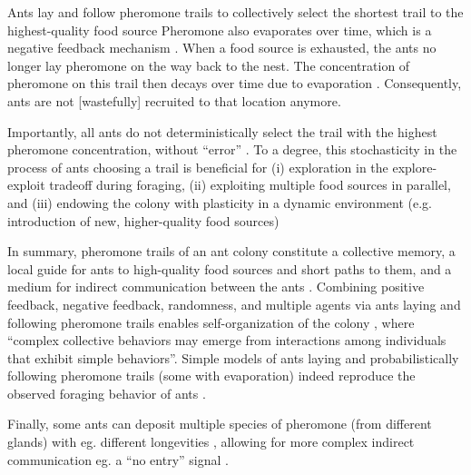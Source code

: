 \documentclass[11pt, oneside]{article}
\begin{document}
\begin{mybox}[label=box:qcmzifs, breakable]{Ants lay and follow pheromone trails to collectively select the shortest trail to the highest-quality food source}
Pheromone also evaporates over time, which is a negative feedback mechanism \cite{jackson2006communication}.
When a food source is exhausted, the ants no longer lay pheromone on the way back to the nest. The concentration of pheromone on this trail then decays over time due to evaporation \cite{david2009trail,van2011temperature}. Consequently, ants are not [wastefully] recruited to that location anymore. 

Importantly, all ants do not deterministically select the trail with the highest pheromone concentration, without ``error'' \cite{deneubourg1990self}.
To a degree, this stochasticity in the process of ants choosing a trail is beneficial for 
(i) exploration in the explore-exploit tradeoff during foraging, 
(ii) exploiting multiple food sources in parallel, 
and 
(iii) endowing the colony with plasticity in a dynamic environment (e.g. introduction of new, higher-quality food sources) \cite{deneubourg1983probabilistic,shiraishi2019diverse,deneubourg1986random,dussutour2009noise,edelstein1995trail}

In summary, pheromone trails of an ant colony constitute a collective memory, a local guide for ants to high-quality food sources and short paths to them, and a medium for indirect communication between the ants \cite{jackson2006communication}. 
Combining positive feedback, negative feedback, randomness, and multiple agents via ants laying and following pheromone trails enables self-organization of the colony \cite{bonabeau1997self}, where ``complex collective behaviors may emerge from interactions among individuals that exhibit simple behaviors''.
Simple models of ants laying and probabilistically following pheromone trails (some with evaporation) indeed reproduce the observed foraging behavior of ants \cite{bonabeau1999swarm,goss1989self,jackson2006communication,edelstein1995trail,watmough1995modelling}.

Finally, some ants can deposit multiple species of pheromone (from different glands) with eg. different longevities \cite{czaczkes2015trail}, allowing for more complex indirect communication \cite{jackson2006communication} eg. a ``no entry'' signal \cite{robinson2005no}. 
\end{mybox}
\end{document}
